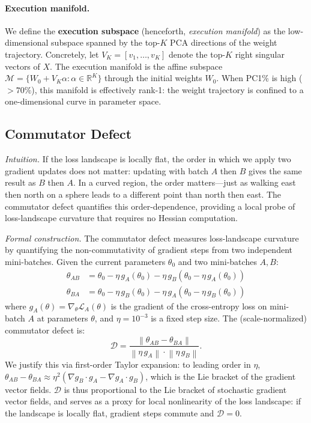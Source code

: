 \documentclass[11pt]{article}
\newcommand{\R}{\mathbb{R}}
\newcommand{\norm}[1]{\left\|#1\right\|}
\newcommand{\defect}{\mathcal{D}}
\begin{document}
\paragraph{Execution manifold.}
We define the \textbf{execution subspace} (henceforth, \emph{execution manifold}) as the low-dimensional subspace spanned by the top-$K$ PCA directions of the weight trajectory.
Concretely, let $V_K = [v_1, \ldots, v_K]$ denote the top-$K$ right singular vectors of $X$.
The execution manifold is the affine subspace $\mathcal{M} = \{W_0 + V_K \alpha : \alpha \in \R^K\}$ through the initial weights $W_0$.
When PC1\% is high ($>70\%$), this manifold is effectively rank-1: the weight trajectory is confined to a one-dimensional curve in parameter space.

\subsection{Commutator Defect}
\label{sec:commutator}

\emph{Intuition.}
If the loss landscape is locally flat, the order in which we apply two gradient updates does not matter: updating with batch $A$ then $B$ gives the same result as $B$ then $A$.
In a curved region, the order matters---just as walking east then north on a sphere leads to a different point than north then east.
The commutator defect quantifies this order-dependence, providing a local probe of loss-landscape curvature that requires no Hessian computation.

\emph{Formal construction.}
The commutator defect measures loss-landscape curvature by quantifying the non-commutativity of gradient steps from two independent mini-batches.
Given the current parameters $\theta_0$ and two mini-batches $A, B$:
\begin{align}
    \theta_{AB} &= \theta_0 - \eta\, g_A(\theta_0) - \eta\, g_B(\theta_0 - \eta\, g_A(\theta_0)) \\
    \theta_{BA} &= \theta_0 - \eta\, g_B(\theta_0) - \eta\, g_A(\theta_0 - \eta\, g_B(\theta_0))
\end{align}
where $g_A(\theta) = \nabla_\theta \mathcal{L}_A(\theta)$ is the gradient of the cross-entropy loss on mini-batch $A$ at parameters $\theta$, and $\eta = 10^{-3}$ is a fixed step size.
The (scale-normalized) commutator defect is:
\begin{equation}
\label{eq:defect}
    \defect = \frac{\norm{\theta_{AB} - \theta_{BA}}}{\norm{\eta\, g_A} \cdot \norm{\eta\, g_B}}.
\end{equation}
We justify this via first-order Taylor expansion: to leading order in $\eta$, $\theta_{AB} - \theta_{BA} \approx \eta^2 (\nabla g_B \cdot g_A - \nabla g_A \cdot g_B)$, which is the Lie bracket of the gradient vector fields.
$\defect$ is thus proportional to the Lie bracket of stochastic gradient vector fields, and serves as a proxy for local nonlinearity of the loss landscape: if the landscape is locally flat, gradient steps commute and $\defect = 0$.
\end{document}
